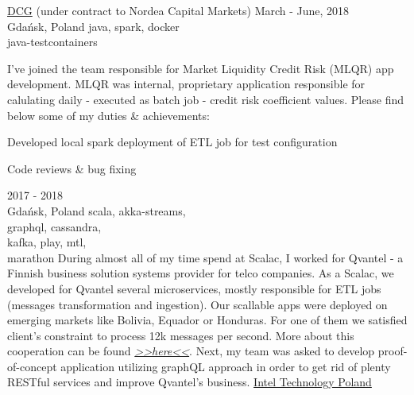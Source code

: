 \documentclass[a4paper,11pt]{cv4tw}%
\begin{document}
      {\href{https://diversecg.pl/}{DCG} (under contract to Nordea Capital Markets)}
      {March - June, 2018\\Gdańsk, Poland}
      {java, spark, docker\\java-testcontainers}
      {I've joined the team responsible for Market Liquidity Credit Risk (MLQR) app development.
        MLQR was internal, proprietary application responsible for calulating daily - executed as batch job - credit risk coefficient values.
        Please find below some of my duties \& achievements:
        \begin{missions}
        \item Developed local spark deployment of ETL job for test configuration
        \item Code reviews \& bug fixing
        \end{missions}
      }
      {2017 - 2018\\Gdańsk, Poland}
      {scala, akka-streams,\\graphql, cassandra,\\kafka, play, mtl,\\marathon}
      {During almost all of my time spend at Scalac, I worked for Qvantel - a Finnish business solution systems provider for telco companies.
        As a Scalac, we developed for Qvantel several microservices, mostly responsible for ETL jobs (messages transformation and ingestion).
        Our scallable apps were deployed on emerging markets like Bolivia, Equador or Honduras. For one of them we satisfied client's constraint
        to process \approx12k messages per second. More about this cooperation can be found
        \href{http://media.licdn.com/embeds/media.html?src=https\%3A\%2F\%2Fissuu.com\%2Foutlookpublishing\%2Fdocs\%2Fqvantel\&amp;url=https\%3A\%2F\%2Fissuu.com\%2Foutlookpublishing\%2Fdocs\%2Fqvantel\&amp;type=text\%2Fhtml\&amp;schema=issuu}{\emph{>>here<<}}. Next, my team was asked to develop proof-of-concept application
        utilizing graphQL approach in order to get rid of plenty RESTful services and improve Qvantel's business.
      }
      {\href{https://www.intel.com/content/www/us/en/jobs/locations/poland.html}
        {Intel Technology Poland}}
\end{document}
